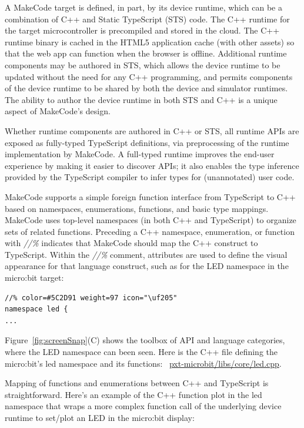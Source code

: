 A MakeCode target is defined, in part, by its device runtime, which can be a combination of C++ 
and Static TypeScript (STS) code. The C++ runtime for the target microcontroller is precompiled 
and stored in the cloud. The C++ runtime binary is cached in the HTML5 application cache (with 
other assets) so that the web app can function when the browser is offline. Additional runtime
components may be authored in STS, which allows the device runtime to be updated without the need
for any C++ programming, and permits components of the device runtime to be shared by both the device
and simulator runtimes. The ability to author the device runtime in both STS and C++ is
a unique aspect of MakeCode's design.

Whether runtime components are authored in C++ or STS, all runtime APIs are exposed as fully-typed
TypeScript definitions, via preprocessing of the runtime implementation by MakeCode. A full-typed runtime improves the end-user experience by making it easier
to discover APIs; it also enables the type inference provided by the TypeScript compiler to infer types
for (unannotated) user code.

MakeCode supports a simple foreign function interface from TypeScript to C++ based on namespaces,
enumerations, functions, and basic type mappings. MakeCode uses top-level namespaces (in both C++ and
TypeScript) to organize sets of related functions.  Preceding a C++ namespace, enumeration, or function
with \emph{//\%} indicates that MakeCode should map the C++ construct to TypeScript.
Within the \emph{//\%} comment, attributes are used to define the visual appearance for that
language construct, such as for the LED namespace in the micro:bit target:

\begin{lstlisting}
//% color=#5C2D91 weight=97 icon="\uf205"
namespace led { 
...
\end{lstlisting}

Figure~\ref{fig:screenSnap}(C) shows the toolbox of API and language categories, where the LED
namespace can been seen. Here is the C++ file defining the micro:bit's led namespace and its functions:
~\href{https://github.com/Microsoft/pxt-microbit/blob/master/libs/core/led.cpp}{pxt-microbit/libs/core/led.cpp}.

Mapping of functions and enumerations between C++ and TypeScript is straightforward. 
Here's an example of the C++ function plot in the led namespace that wraps a more
complex function call of the underlying device runtime to set/plot an LED in the micro:bit display:


